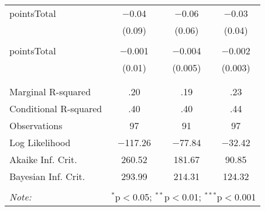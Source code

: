 \begin{table}[!htbp]
\begin{tabular}{@{\extracolsep{5pt}}lccc}
 pointsTotal & $-$0.04 & $-$0.06 & $-$0.03 \\ 
  & (0.09) & (0.06) & (0.04) \\ 
  & & & \\ 
 pointsTotal & $-$0.001 & $-$0.004 & $-$0.002 \\ 
  & (0.01) & (0.005) & (0.003) \\ 
  & & & \\ 
\hline \\[-1.8ex] 
Marginal R-squared & .20 & .19 & .23 \\ 
Conditional R-squared & .40 & .40 & .44 \\ 
Observations & 97 & 91 & 97 \\ 
Log Likelihood & $-$117.26 & $-$77.84 & $-$32.42 \\ 
Akaike Inf. Crit. & 260.52 & 181.67 & 90.85 \\ 
Bayesian Inf. Crit. & 293.99 & 214.31 & 124.32 \\ 
\hline 
\hline \\[-1.8ex] 
\textit{Note:}  & \multicolumn{3}{r}{$^{*}$p$<$0.05; $^{**}$p$<$0.01; $^{***}$p$<$0.001} \\ 
\end{tabular} 
\end{table} 
